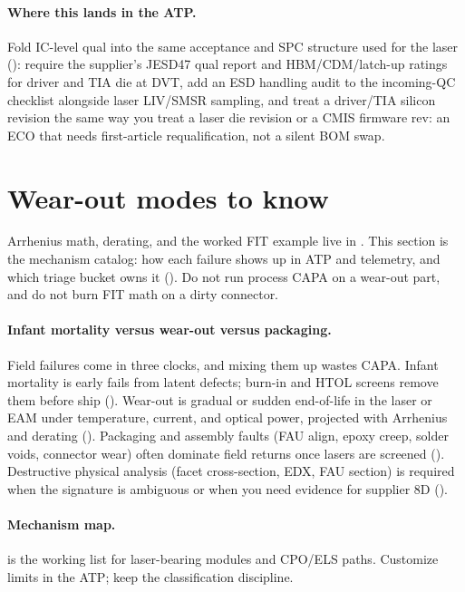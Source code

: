 \paragraph{Where this lands in the ATP.}
Fold IC-level qual into the same acceptance and SPC structure used for the laser
(): require the supplier's JESD47 qual
report and HBM/CDM/latch-up ratings for driver and TIA die at DVT, add an ESD
handling audit to the incoming-QC checklist alongside laser LIV/SMSR sampling,
and treat a driver/TIA silicon revision the same way you treat a laser die
revision or a CMIS firmware rev: an ECO that needs first-article requalification,
not a silent BOM swap.

\section{Wear-out modes to know}
\label{sec:wearout-modes}

Arrhenius math, derating, and the worked FIT example live in
. This section is the mechanism catalog: how each failure
shows up in ATP and telemetry, and which triage bucket owns it
(). Do not run process CAPA on a wear-out part, and do not
burn FIT math on a dirty connector.

\paragraph{Infant mortality versus wear-out versus packaging.}
Field failures come in three clocks, and mixing them up wastes CAPA. Infant
mortality is early fails from latent defects; burn-in and HTOL screens remove them
before ship (). Wear-out is gradual or sudden end-of-life in the
laser or EAM under temperature, current, and optical power, projected with
Arrhenius and derating (). Packaging and assembly faults
(FAU align, epoxy creep, solder voids, connector wear) often dominate field
returns once lasers are screened ().
Destructive physical analysis (facet cross-section, EDX, FAU section) is required
when the signature is ambiguous or when you need evidence for supplier 8D
().

\paragraph{Mechanism map.}
 is the working list for laser-bearing modules and CPO/ELS
paths. Customize limits in the ATP; keep the classification discipline.

